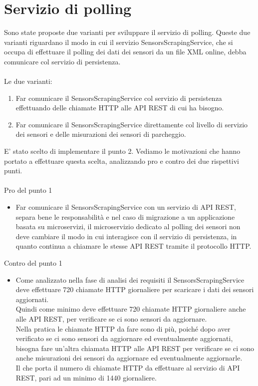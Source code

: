 \section{Servizio di polling}
Sono state proposte due varianti per sviluppare il servizio di polling. Queste due varianti riguardano il
modo in cui il servizio SensorsScrapingService, che si occupa di effettuare il polling dei dati dei sensori
da un file \gls{XML} online, debba comunicare col servizio di persistenza.
\\\\
Le due varianti:
\begin{enumerate}
    \item Far comunicare il SensorsScrapingService col servizio di persistenza effettuando delle chiamate \gls{HTTP} 
        alle \gls{API} \gls{REST} di cui ha bisogno.
    \item Far comunicare il SensorsScrapingService direttamente col livello di servizio dei sensori e delle misurazioni 
    dei sensori di parcheggio.
\end{enumerate}
\leavevmode\newline
E' stato scelto di implementare il punto 2. Vediamo le motivazioni che hanno portato a effettuare questa scelta, analizzando pro e 
contro dei due rispettivi punti.
\\\\
Pro del punto 1
\begin{itemize}
    \item Far comunicare il SensorsScrapingService con un servizio di \gls{API} \gls{REST}, separa bene le responsabilità e 
        nel caso di migrazione a un applicazione basata su microservizi, il microservizio dedicato al polling dei sensori 
        non deve cambiare il modo in cui interagisce
        con il servizio di persistenza, in quanto continua a chiamare le stesse \gls{API} \gls{REST} tramite il protocollo \gls{HTTP}.
\end{itemize}
\leavevmode\newline
Contro del punto 1
\begin{itemize}
    \item Come analizzato nella fase di analisi dei requisiti il SensorsScrapingService deve effettuare 720 chiamate \gls{HTTP} giornaliere
        per scaricare i dati dei sensori aggiornati. 
        \\
        Quindi come minimo deve effettuare 720 chiamate \gls{HTTP} giornaliere anche alle \gls{API} \gls{REST}, per verificare se ci sono sensori
        da aggiornare. 
        \\
        Nella pratica le chiamate \gls{HTTP} da fare sono di più, poiché dopo aver verificato se ci sono sensori da aggiornare ed
        eventualmente aggiornati, bisogna fare un'altra chiamata \gls{HTTP} alle \gls{API} \gls{REST} per verificare se ci sono anche misurazioni dei sensori
        da aggiornare ed eventualmente aggiornarle. 
        \\
        Il che porta il numero di chiamate \gls{HTTP} da effettuare al servizio di \gls{API} \gls{REST}, pari ad un minimo di 1440 giornaliere.
\end{itemize}
